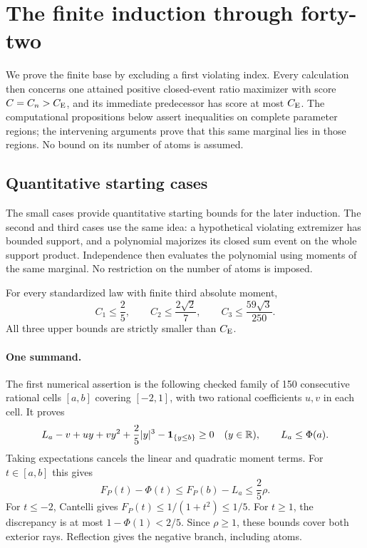 \section{The finite induction through forty-two}\label{j:finite:chapter}
We prove the finite base by excluding a first violating index. Every
calculation then concerns one attained positive closed-event ratio maximizer
with score $C=C_n>C_{\mathrm E}$, and its immediate predecessor has score at most
$C_{\mathrm E}$. The computational propositions below assert inequalities on complete
parameter regions; the intervening arguments prove that this same marginal
lies in those regions. No bound on its number of atoms is assumed.

\subsection{Quantitative starting cases}\label{j:finite:starting}

The small cases provide quantitative starting bounds for the later
induction.  The second and third cases use the same idea: a hypothetical
violating extremizer has bounded support, and a polynomial majorizes its
closed sum event on the whole support product.  Independence then evaluates
the polynomial using moments of the same marginal.  No restriction on the
number of atoms is imposed.

\begin{theorem}\label{j:finite:n123}
For every standardized law with finite third absolute moment,
\[
 C_1\le\frac25,\qquad C_2\le\frac{2\sqrt2}{7},\qquad
 C_3\le\frac{59\sqrt3}{250}.
\]
All three upper bounds are strictly smaller than $C_{\mathrm E}$.
\end{theorem}

\paragraph{One summand.}
The first numerical assertion is the following checked family of 150 consecutive rational cells $[a,b]$
covering $[-2,1]$, with two rational coefficients $u,v$ in each cell.
It proves
\begin{equation}\label{j:finite:n1-dual}
 L_a-v+uy+vy^2+\frac25|y|^3-\mathbf1_{\{y\le b\}}\ge0
 \quad(y\in\mathbb R),\qquad L_a\le\Phi(a).
\end{equation}
Taking expectations cancels the linear and quadratic moment terms.
For $t\in[a,b]$ this gives
\[
 F_P(t)-\Phi(t)\le F_P(b)-L_a\le\frac25\rho.
\]
For $t\le-2$, Cantelli gives $F_P(t)\le1/(1+t^2)\le1/5$.
For $t\ge1$, the discrepancy is at most $1-\Phi(1)<2/5$.
Since $\rho\ge1$, these bounds cover both exterior rays.
Reflection gives the negative branch, including atoms.

